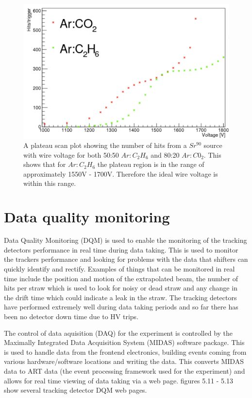 \begin{figure}[th]
\centering
\includegraphics[scale=0.8]{Figures/plateau}
\decoRule
\caption{A plateau scan plot showing the number of hits from a $Sr^{90}$ source with wire voltage for both 50:50 $Ar:C_{2}H_{6}$ and 80:20 $Ar:C0_{2}$. This shows that for $Ar:C_{2}H_{6}$ the plateau region is in the range of approximately 1550V - 1700V. Therefore the ideal wire voltage is within this range.}
\label{fig:plateau}
\end{figure}

\section{Data quality monitoring}

Data Quality Monitoring (DQM) is used to enable the monitoring of the tracking detectors performance in real time during data taking. This is used to monitor the trackers performance and looking for problems with the data that shifters can quickly identify and rectify. Examples of things that can be monitored in real time include the position and motion of the extrapolated beam, the number of hits per straw which is used to look for noisy or dead straw and any change in the drift time which could indicate a leak in the straw. The tracking detectors have performed extremely well during data taking periods and so far there has been no detector down time due to HV trips. 

The control of data aquisition (DAQ) for the experiment is controlled by the Maximally Integrated Data Acquisition System (MIDAS) software package. This is used to handle data from the frontend electronics, building events coming from various hardware/software locations and writing the data. This converts MIDAS data to ART data (the event processing framework used for the experiment) and allows for real time viewing of data taking via a web page. figures 5.11 - 5.13 show several tracking detector DQM web pages.

